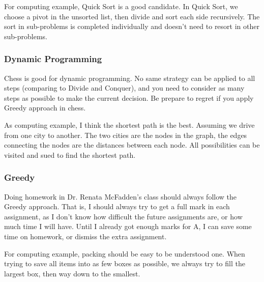 \documentclass[natbib,12pt]{article}
\begin{document}
	For computing example, Quick Sort is a good candidate. In Quick Sort, we choose a pivot in the unsorted list, then divide and sort each side recursively. The sort in sub-problems is completed individually and doesn't need to resort in other sub-problems.
	
	\subsubsection*{Dynamic Programming}
	Chess is good for dynamic programming. No same strategy can be applied to all steps (comparing to Divide and Conquer), and you need to consider as many steps as possible to make the current decision. Be prepare to regret if you apply Greedy approach in chess.
	
	As computing example, I think the shortest path is the best. Assuming we drive from one city to another. The two cities are the nodes in the graph, the edges connecting the nodes are the distances between each node. All possibilities can be visited and sued to find the shortest path.
	
	\subsubsection*{Greedy}
	Doing homework in Dr. Renata McFadden's class should always follow the Greedy approach. That is, I should always try to get a full mark in each assignment, as I don't know how difficult the future assignments are, or how much time I will have. Until I already got enough marks for A, I can save some time on homework, or dismiss the extra assignment.
	
	For computing example, packing should be easy to be understood one. When trying to save all items into as few boxes as possible, we always try to fill the largest box, then way down to the smallest.
	
	
\end{document}
